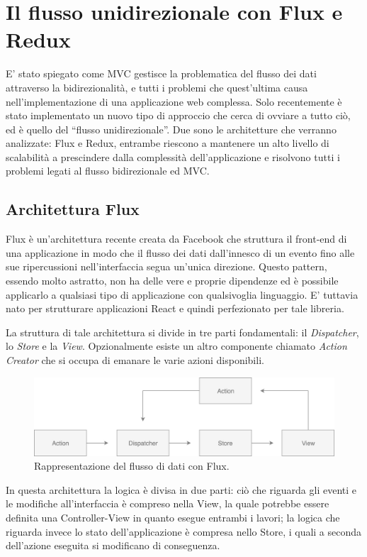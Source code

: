 \chapter{Il flusso unidirezionale con Flux e Redux}
E' stato spiegato come MVC gestisce la problematica del flusso dei dati attraverso la bidirezionalità, e tutti i problemi che quest'ultima causa nell'implementazione di una applicazione web complessa. Solo recentemente è stato implementato un nuovo tipo di approccio che cerca di ovviare a tutto ciò, ed è quello del “flusso unidirezionale”. Due sono le architetture che verranno analizzate: Flux e Redux, entrambe riescono a mantenere un alto livello di scalabilità a prescindere dalla complessità dell'applicazione e risolvono tutti i problemi legati al flusso bidirezionale ed MVC.

\section{Architettura Flux}
Flux è un'architettura recente creata da Facebook che struttura il front-end di una applicazione in modo che il flusso dei dati dall'innesco di un evento fino alle sue ripercussioni nell'interfaccia segua un'unica direzione.
Questo pattern, essendo molto astratto, non ha delle vere e proprie dipendenze ed è possibile applicarlo a qualsiasi tipo di applicazione con qualsivoglia linguaggio. E' tuttavia nato per strutturare applicazioni React e quindi perfezionato per tale libreria.

La struttura di tale architettura si divide in tre parti fondamentali: il \textit{Dispatcher}, lo \textit{Store} e la \textit{View}. Opzionalmente esiste un altro componente chiamato \textit{Action Creator} che si occupa di emanare le varie azioni disponibili.

\begin{figure}[h]
\centering
\vspace*{0.5cm} 
\includegraphics[width=14cm]{./images/FluxWorkflow}
\caption{Rappresentazione del flusso di dati con Flux.}
\label{FluxWorkflow}
\vspace*{0.5cm} 
\end{figure}

\noindent
In questa architettura la logica è divisa in due parti: ciò che riguarda gli eventi e le modifiche all'interfaccia è compreso nella View, la quale potrebbe essere definita una Controller-View in quanto esegue entrambi i lavori; la logica che riguarda invece lo stato dell'applicazione è compresa nello Store, i quali a seconda dell'azione eseguita si modificano di conseguenza.

